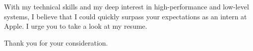 \documentclass[11pt, letterpaper]{awesome-cv}
\begin{document}
\begin{cvletter}
With my technical skills and my deep interest in high-performance and low-level systems, I believe that I could quickly surpass your expectations as an intern at Apple. I urge you to take a look at my resume.

Thank you for your consideration.
\end{cvletter}


\makeletterclosing
\end{document}
